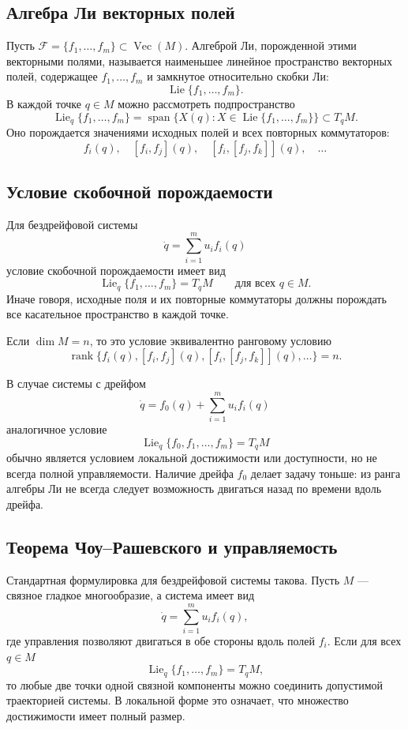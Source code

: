 \documentclass[12pt,a4paper]{article}
\newcommand{\Lie}{\operatorname{Lie}}
\newcommand{\Vect}{\operatorname{Vec}}
\newcommand{\rank}{\operatorname{rank}}
\begin{document}
\subsection*{Алгебра Ли векторных полей}
Пусть $\mathcal F=\{f_1,\ldots,f_m\}\subset\Vect(M)$. Алгеброй Ли, порожденной этими векторными полями, называется наименьшее линейное пространство векторных полей, содержащее $f_1,\ldots,f_m$ и замкнутое относительно скобки Ли:
\[
\Lie\{f_1,\ldots,f_m\}.
\]
В каждой точке $q\in M$ можно рассмотреть подпространство
\[
\Lie_q\{f_1,\ldots,f_m\}
=
\operatorname{span}\{X(q):X\in\Lie\{f_1,\ldots,f_m\}\}\subset T_qM.
\]
Оно порождается значениями исходных полей и всех повторных коммутаторов:
\[
f_i(q),\quad [f_i,f_j](q),\quad [f_i,[f_j,f_k]](q),\quad \ldots
\]

\subsection*{Условие скобочной порождаемости}
Для бездрейфовой системы
\[
\dot q=\sum_{i=1}^m u_i f_i(q)
\]
условие скобочной порождаемости имеет вид
\[
\Lie_q\{f_1,\ldots,f_m\}=T_qM
\qquad \text{для всех }q\in M.
\]
Иначе говоря, исходные поля и их повторные коммутаторы должны порождать все касательное пространство в каждой точке.

Если $\dim M=n$, то это условие эквивалентно ранговому условию
\[
\rank\{f_i(q),[f_i,f_j](q),[f_i,[f_j,f_k]](q),\ldots\}=n.
\]

В случае системы с дрейфом
\[
\dot q=f_0(q)+\sum_{i=1}^m u_i f_i(q)
\]
аналогичное условие
\[
\Lie_q\{f_0,f_1,\ldots,f_m\}=T_qM
\]
обычно является условием локальной достижимости или доступности, но не всегда полной управляемости. Наличие дрейфа $f_0$ делает задачу тоньше: из ранга алгебры Ли не всегда следует возможность двигаться назад по времени вдоль дрейфа.

\subsection*{Теорема Чоу--Рашевского и управляемость}
Стандартная формулировка для бездрейфовой системы такова. Пусть $M$ --- связное гладкое многообразие, а система имеет вид
\[
\dot q=\sum_{i=1}^m u_i f_i(q),
\]
где управления позволяют двигаться в обе стороны вдоль полей $f_i$. Если для всех $q\in M$
\[
\Lie_q\{f_1,\ldots,f_m\}=T_qM,
\]
то любые две точки одной связной компоненты можно соединить допустимой траекторией системы. В локальной форме это означает, что множество достижимости имеет полный размер.
\end{document}
